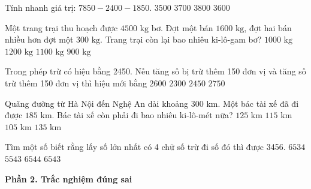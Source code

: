 \begin{ex} %
Tính nhanh giá trị: $7850 - 2400 - 1850$.
\choice
{$3500$}
{$3700$}
{$3800$}
{\True $3600$}
\end{ex}

\begin{ex} %
Một trang trại thu hoạch được $4500\text{ kg}$ bơ. Đợt một bán $1600\text{ kg}$, đợt hai bán nhiều hơn đợt một $300\text{ kg}$. Trang trại còn lại bao nhiêu ki-lô-gam bơ?
\choice
{\True $1000\text{ kg}$}
{$1200\text{ kg}$}
{$1100\text{ kg}$}
{$900\text{ kg}$}
\end{ex}

\begin{ex} %
Trong phép trừ có hiệu bằng 2450. Nếu tăng số bị trừ thêm 150 đơn vị và tăng số trừ thêm 150 đơn vị thì hiệu mới bằng
\choice
{$2600$}
{$2300$}
{\True $2450$}
{$2750$}
\end{ex}

\begin{ex} %
Quãng đường từ Hà Nội đến Nghệ An dài khoảng $300\text{ km}$. Một bác tài xế đã đi được $185\text{ km}$. Bác tài xế còn phải đi bao nhiêu ki-lô-mét nữa?
\choice
{$125\text{ km}$}
{\True $115\text{ km}$}
{$105\text{ km}$}
{$135\text{ km}$}
\end{ex}

\begin{ex} %
Tìm một số biết rằng lấy số lớn nhất có 4 chữ số trừ đi số đó thì được 3456.
\choice
{$6534$}
{$5543$}
{$6544$}
{\True $6543$}
\end{ex}

\textbf{Phần 2. Trắc nghiệm đúng sai}

